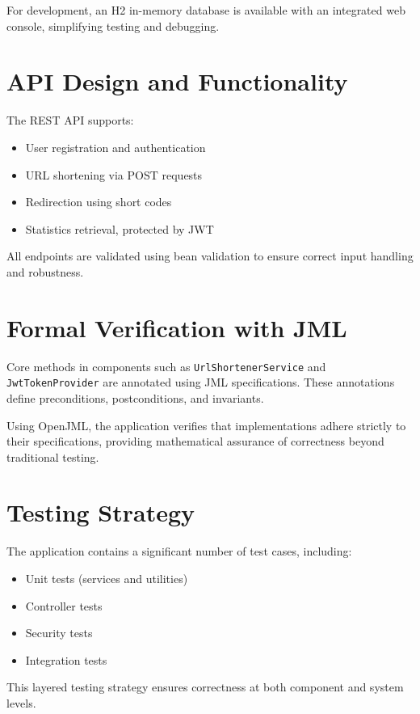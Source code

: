 \documentclass[sigconf]{acmart}
\begin{document}
For development, an H2 in-memory database is available with an integrated web console, simplifying testing and debugging.

\section{API Design and Functionality}
The REST API supports:
\begin{itemize}
  \item User registration and authentication
  \item URL shortening via POST requests
  \item Redirection using short codes
  \item Statistics retrieval, protected by JWT
\end{itemize}

All endpoints are validated using bean validation to ensure correct input handling and robustness.

\section{Formal Verification with JML}
Core methods in components such as \texttt{UrlShortenerService} and \texttt{JwtTokenProvider} are annotated using JML specifications. These annotations define preconditions, postconditions, and invariants.

Using OpenJML, the application verifies that implementations adhere strictly to their specifications, providing mathematical assurance of correctness beyond traditional testing.

\section{Testing Strategy}
The application contains a significant number of test cases, including:
\begin{itemize}
  \item Unit tests (services and utilities)
  \item Controller tests
  \item Security tests
  \item Integration tests
\end{itemize}

This layered testing strategy ensures correctness at both component and system levels.
\end{document}
